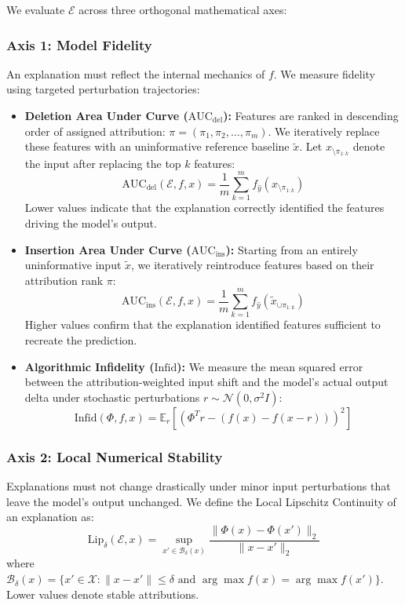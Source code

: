 \documentclass[10pt,journal,compsoc]{IEEEtran}
\begin{document}
We evaluate $\mathcal{E}$ across three orthogonal mathematical axes:

\subsubsection{Axis 1: Model Fidelity}
An explanation must reflect the internal mechanics of $f$. We measure fidelity using targeted perturbation trajectories:
\begin{itemize}
    \item \textbf{Deletion Area Under Curve ($\text{AUC}_{\text{del}}$):} Features are ranked in descending order of assigned attribution: $\pi = (\pi_1, \pi_2, \dots, \pi_m)$. We iteratively replace these features with an uninformative reference baseline $\tilde{x}$. Let $x_{\setminus \pi_{1:k}}$ denote the input after replacing the top $k$ features:
    \begin{equation}
    \text{AUC}_{\text{del}}(\mathcal{E}, f, x) = \frac{1}{m} \sum_{k=1}^m f_{\hat{y}}\left(x_{\setminus \pi_{1:k}}\right)
    \end{equation}
    Lower values indicate that the explanation correctly identified the features driving the model's output.
    
    \item \textbf{Insertion Area Under Curve ($\text{AUC}_{\text{ins}}$):} Starting from an entirely uninformative input $\tilde{x}$, we iteratively reintroduce features based on their attribution rank $\pi$:
    \begin{equation}
    \text{AUC}_{\text{ins}}(\mathcal{E}, f, x) = \frac{1}{m} \sum_{k=1}^m f_{\hat{y}}\left(\tilde{x}_{\cup \pi_{1:k}}\right)
    \end{equation}
    Higher values confirm that the explanation identified features sufficient to recreate the prediction.
    
    \item \textbf{Algorithmic Infidelity ($\text{Infid}$):} We measure the mean squared error between the attribution-weighted input shift and the model's actual output delta under stochastic perturbations $r \sim \mathcal{N}(0, \sigma^2 I)$:
    \begin{equation}
    \text{Infid}(\Phi, f, x) = \mathbb{E}_{r} \left[ \left( \Phi^T r - \left( f(x) - f(x - r) \right) \right)^2 \right]
    \end{equation}
\end{itemize}

\subsubsection{Axis 2: Local Numerical Stability}
Explanations must not change drastically under minor input perturbations that leave the model's output unchanged. We define the Local Lipschitz Continuity of an explanation as:
\begin{equation}
\text{Lip}_{\delta}(\mathcal{E}, x) = \sup_{x' \in \mathcal{B}_\delta(x)} \frac{\|\Phi(x) - \Phi(x')\|_2}{\|x - x'\|_2}
\end{equation}
where $\mathcal{B}_\delta(x) = \{x' \in \mathcal{X} : \|x - x'\| \le \delta \text{ and } \arg\max f(x) = \arg\max f(x')\}$. Lower values denote stable attributions.
\end{document}
